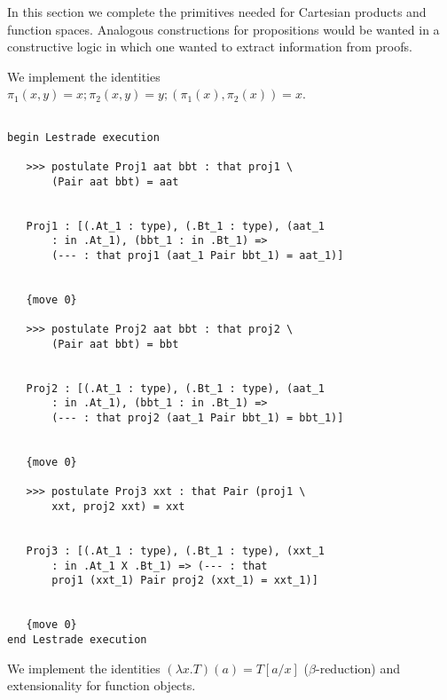 \documentclass[12pt]{article}
\begin{document}
In this section we complete the primitives needed for Cartesian products and function spaces.  Analogous constructions for propositions would be wanted
in a constructive logic in which one wanted to extract information from proofs.

We implement the identities $\pi_1(x,y)=x; \pi_2(x,y)=y; (\pi_1(x),\pi_2(x))=x$.

\begin{verbatim}

begin Lestrade execution

   >>> postulate Proj1 aat bbt : that proj1 \
       (Pair aat bbt) = aat


   Proj1 : [(.At_1 : type), (.Bt_1 : type), (aat_1 
       : in .At_1), (bbt_1 : in .Bt_1) => 
       (--- : that proj1 (aat_1 Pair bbt_1) = aat_1)]


   {move 0}

   >>> postulate Proj2 aat bbt : that proj2 \
       (Pair aat bbt) = bbt


   Proj2 : [(.At_1 : type), (.Bt_1 : type), (aat_1 
       : in .At_1), (bbt_1 : in .Bt_1) => 
       (--- : that proj2 (aat_1 Pair bbt_1) = bbt_1)]


   {move 0}

   >>> postulate Proj3 xxt : that Pair (proj1 \
       xxt, proj2 xxt) = xxt


   Proj3 : [(.At_1 : type), (.Bt_1 : type), (xxt_1 
       : in .At_1 X .Bt_1) => (--- : that 
       proj1 (xxt_1) Pair proj2 (xxt_1) = xxt_1)]


   {move 0}
end Lestrade execution
\end{verbatim}

We implement the identities $(\lambda x.T)(a) = T[a/x]$ ($\beta$-reduction) and extensionality for function objects.
\end{document}
